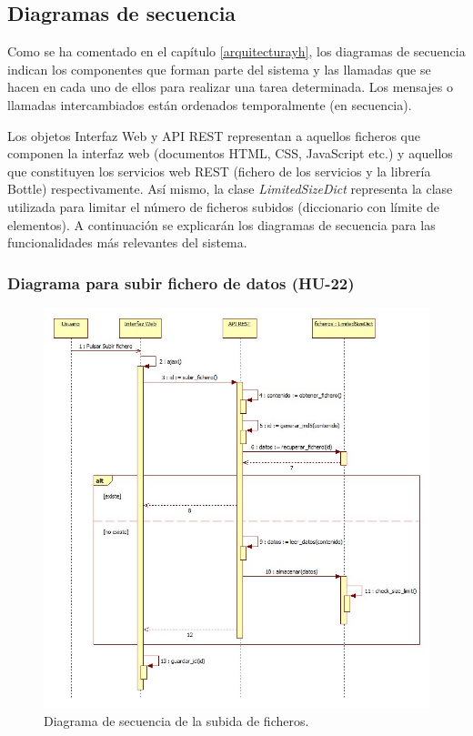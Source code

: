 \subsection{Diagramas de secuencia}
Como se ha comentado en el capítulo \ref{arquitecturayh}, los diagramas de secuencia indican los componentes que forman parte del sistema y las llamadas que se hacen en cada uno de ellos para realizar una tarea determinada. Los mensajes o llamadas intercambiados están ordenados temporalmente (en secuencia).

Los objetos Interfaz Web y API REST representan a aquellos ficheros que componen la interfaz web (documentos HTML, CSS, JavaScript etc.) y aquellos que constituyen los servicios web REST (fichero de los servicios y la librería Bottle) respectivamente. Así mismo, la clase \textit{LimitedSizeDict} representa la clase utilizada para limitar el número de ficheros subidos (diccionario con límite de elementos). A continuación se explicarán los diagramas de secuencia para las funcionalidades más relevantes del sistema.

\subsubsection{Diagrama para subir fichero de datos (HU-22)}

\begin{figure}[H]
\centering
\includegraphics[scale=0.5]{figuras/sec_subir_fichero.jpg}
\caption{Diagrama de secuencia de la subida de ficheros.}
\label{fig:sec_subir_fichero}
\end{figure}

